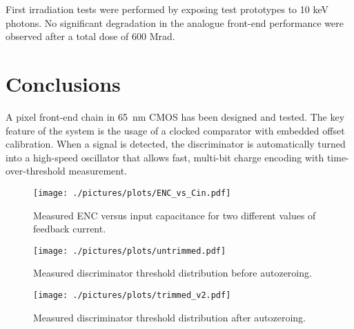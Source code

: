\documentclass[conference]{./templates/IEEEtran/IEEEtran}
\begin{document}
First irradiation tests were performed by exposing test prototypes to 10 keV photons. 
No significant degradation in the analogue front-end performance were observed after a total
dose of 600 Mrad.


\vspace*{0.5cm}

\section{Conclusions}
A pixel front-end chain in 65~nm CMOS has been designed and tested. The key feature of the system 
is the usage of a clocked comparator with embedded offset calibration. 
When a signal is detected, the discriminator is automatically turned into a high-speed oscillator 
that allows fast, multi-bit charge encoding with time-over-threshold measurement. 




\begin{center}
\begin{figure}[!htpb]
\centering
\texttt{[image: ./pictures/plots/ENC\_vs\_Cin.pdf]}
\caption{Measured ENC versus input capacitance for two different \break 
         values of feedback current.}  
\label{noise}
\end{figure}
\end{center}



\begin{center}
\begin{figure}[!htpb]
\centering
\texttt{[image: ./pictures/plots/untrimmed.pdf]}
\caption{Measured discriminator threshold distribution before autozeroing.}  
\label{untrimmed}
\end{figure}
\end{center}





\begin{center}
\begin{figure}[!htpb]
\centering
\texttt{[image: ./pictures/plots/trimmed\_v2.pdf]}
\caption{Measured discriminator threshold distribution after autozeroing.}  
\label{trimmed}
\end{figure}
\end{center}
\end{document}

